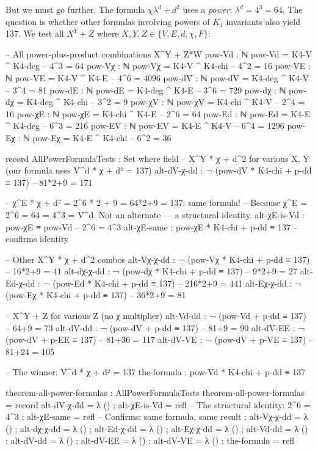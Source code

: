 \documentclass[11pt,a4paper]{book}
\begin{document}
But we must go further. The formula $\chi \lambda^d + d^2$ uses a \emph{power}:
$\lambda^d = 4^3 = 64$. The question is whether other formulas involving
powers of $K_4$ invariants also yield 137. We test all $X^Y + Z$ where
$X, Y, Z \in \{V, E, d, \chi, F\}$:

\begin{code}
-- All power-plus-product combinations X^Y + Z*W
pow-Vd : ℕ
pow-Vd = K4-V ^ K4-deg        -- 4^3 = 64
pow-Vχ : ℕ
pow-Vχ = K4-V ^ K4-chi        -- 4^2 = 16
pow-VE : ℕ
pow-VE = K4-V ^ K4-E          -- 4^6 = 4096
pow-dV : ℕ
pow-dV = K4-deg ^ K4-V        -- 3^4 = 81
pow-dE : ℕ
pow-dE = K4-deg ^ K4-E        -- 3^6 = 729
pow-dχ : ℕ
pow-dχ = K4-deg ^ K4-chi      -- 3^2 = 9
pow-χV : ℕ
pow-χV = K4-chi ^ K4-V        -- 2^4 = 16
pow-χE : ℕ
pow-χE = K4-chi ^ K4-E        -- 2^6 = 64
pow-Ed : ℕ
pow-Ed = K4-E ^ K4-deg        -- 6^3 = 216
pow-EV : ℕ
pow-EV = K4-E ^ K4-V          -- 6^4 = 1296
pow-Eχ : ℕ
pow-Eχ = K4-E ^ K4-chi        -- 6^2 = 36

record AllPowerFormulaTests : Set where
  field
    -- X^Y * χ + d^2 for various X, Y (our formula uses V^d * χ + d² = 137)
    alt-dV-χ-dd  : ¬ (pow-dV * K4-chi + p-dd ≡ 137)   -- 81*2+9 = 171

    -- χ^E * χ + d² = 2^6 * 2 + 9 = 64*2+9 = 137: same formula!
    -- Because χ^E = 2^6 = 64 = 4^3 = V^d. Not an alternate — a structural identity.
    alt-χE-is-Vd     : pow-χE ≡ pow-Vd                     -- 2^6 = 4^3
    alt-χE-same       : pow-χE * K4-chi + p-dd ≡ 137       -- confirms identity

    -- Other X^Y * χ + d^2 combos
    alt-Vχ-χ-dd  : ¬ (pow-Vχ * K4-chi + p-dd ≡ 137)   -- 16*2+9 = 41
    alt-dχ-χ-dd  : ¬ (pow-dχ * K4-chi + p-dd ≡ 137)   -- 9*2+9 = 27
    alt-Ed-χ-dd  : ¬ (pow-Ed * K4-chi + p-dd ≡ 137)   -- 216*2+9 = 441
    alt-Eχ-χ-dd  : ¬ (pow-Eχ * K4-chi + p-dd ≡ 137)   -- 36*2+9 = 81

    -- X^Y + Z for various Z (no χ multiplier)
    alt-Vd-dd    : ¬ (pow-Vd + p-dd ≡ 137)             -- 64+9 = 73
    alt-dV-dd    : ¬ (pow-dV + p-dd ≡ 137)             -- 81+9 = 90
    alt-dV-EE    : ¬ (pow-dV + p-EE ≡ 137)             -- 81+36 = 117
    alt-dV-VE    : ¬ (pow-dV + p-VE ≡ 137)             -- 81+24 = 105

    -- The winner: V^d * χ + d² = 137
    the-formula  : pow-Vd * K4-chi + p-dd ≡ 137

theorem-all-power-formulas : AllPowerFormulaTests
theorem-all-power-formulas = record
  { alt-dV-χ-dd  = λ ()
  ; alt-χE-is-Vd = refl      -- The structural identity: 2^6 = 4^3
  ; alt-χE-same  = refl      -- Confirms: same formula, same result
  ; alt-Vχ-χ-dd  = λ ()
  ; alt-dχ-χ-dd  = λ ()
  ; alt-Ed-χ-dd  = λ ()
  ; alt-Eχ-χ-dd  = λ ()
  ; alt-Vd-dd    = λ ()
  ; alt-dV-dd    = λ ()
  ; alt-dV-EE    = λ ()
  ; alt-dV-VE    = λ ()
  ; the-formula  = refl
  }
\end{code}
\end{document}
